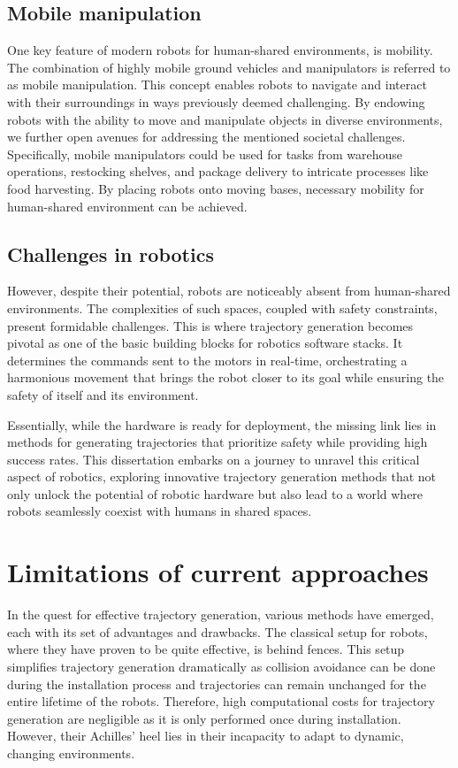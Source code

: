 \subsection{Mobile manipulation}

One key feature of modern robots for human-shared
environments, is mobility. The combination of highly mobile
ground vehicles and manipulators is referred to as mobile
manipulation. This concept enables robots to navigate and
interact with their surroundings in ways previously deemed
challenging. By endowing robots with the ability to move and
manipulate objects in diverse environments, we further open
avenues for addressing the mentioned societal challenges.
Specifically, mobile manipulators could be used for tasks
from warehouse operations, restocking shelves, and package
delivery to intricate processes like food harvesting.
By placing robots onto moving bases, necessary mobility for
human-shared environment can be achieved.

\subsection{Challenges in robotics}

However, despite their potential, robots are noticeably
absent from human-shared environments. The complexities of
such spaces, coupled with safety constraints, present
formidable challenges. This is where trajectory generation
becomes pivotal as one of the basic building blocks for
robotics software stacks. It determines the commands sent to
the motors in real-time, orchestrating a harmonious movement
that brings the robot closer to its goal while ensuring the
safety of itself and its environment.

Essentially, while the hardware is ready for deployment, the
missing link lies in methods for generating trajectories
that prioritize safety while providing high success rates.
This dissertation embarks on a journey to unravel this
critical aspect of robotics, exploring innovative trajectory
generation methods that not only unlock the potential of
robotic hardware but also lead to a world where robots
seamlessly coexist with humans in shared spaces.

\section{Limitations of current approaches}

In the quest for effective trajectory generation, various
methods have emerged, each with its set of advantages and
drawbacks. The classical setup for robots, where they have
proven to be quite effective, is behind fences. This setup
simplifies trajectory generation dramatically as collision
avoidance can be done during the installation process and
trajectories can remain unchanged for the entire lifetime of
the robots. Therefore, high computational costs for
trajectory generation are negligible as it is only performed
once during installation. However, their Achilles' heel lies
in their incapacity to adapt to dynamic, changing
environments.

